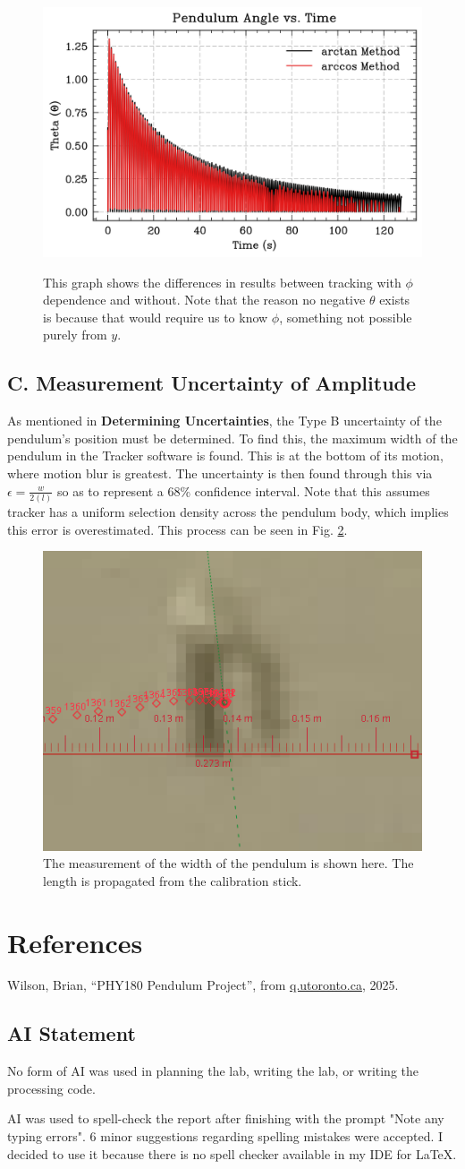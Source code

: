 \documentclass[prl,twocolumn,amsmath,amssymb,superscriptaddress]{revtex4-2}
\begin{document}
\begin{figure}[htb]
    \includegraphics[width=0.4\linewidth]{out-of-plane.png}
    \label{fig:out-of-plane}
    \caption{This graph shows the differences in results between tracking with $\phi$ dependence and without. Note that the reason no negative $\theta$ exists is because that would require us to know $\phi$, something not possible purely from $y$.}
\end{figure}

\subsection{C. Measurement Uncertainty of Amplitude}

As mentioned in \textbf{Determining Uncertainties}, the Type B uncertainty of the pendulum's position must be determined. To find this, the maximum width of the pendulum in the Tracker software is found. This is at the bottom of its motion, where motion blur is greatest. The uncertainty is then found through this via $\epsilon = \frac{w}{2(l)}$ so as to represent a 68\% confidence interval. Note that this assumes tracker has a uniform selection density across the pendulum body, which implies this error is overestimated. This process can be seen in Fig. \ref{fig:body}.
\begin{figure}[htb]
    \includegraphics[width=0.2\linewidth]{pendulum-body.png}
    \caption{The measurement of the width of the pendulum is shown here. The length is propagated from the calibration stick.}
    \label{fig:body}
\end{figure}

\newpage

\section{References}

Wilson, Brian, “PHY180 Pendulum Project”, from
\href{https://q.utoronto.ca/courses/411727/files/39071655?module_item_id=7122439}{q.utoronto.ca}, 2025.


\subsection{AI Statement}

No form of AI was used in planning the lab, writing the lab, or writing the processing code.

AI was used to spell-check the report after finishing with the prompt "Note any typing errors". 6 minor suggestions regarding spelling mistakes were accepted. I decided to use it because there is no spell checker available in my IDE for LaTeX.
\end{document}
